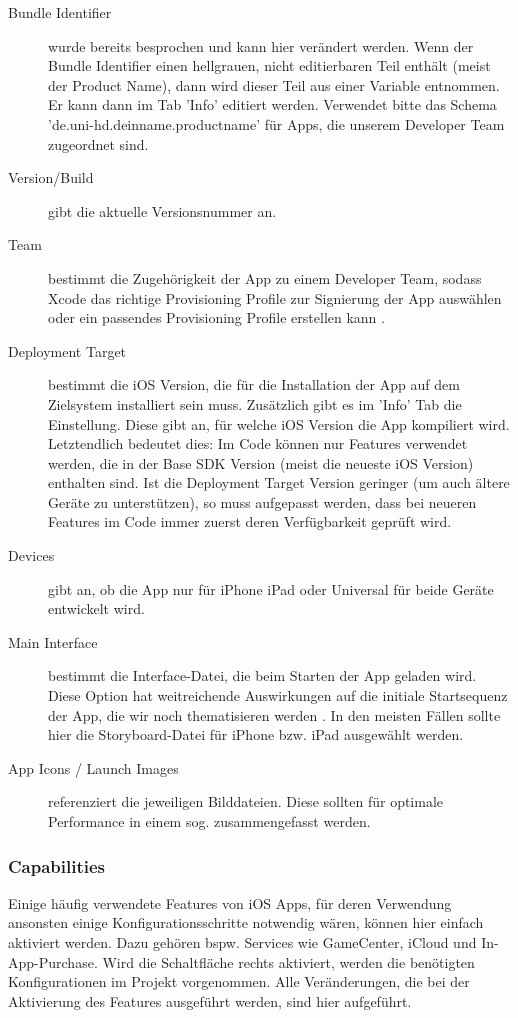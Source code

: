 \documentclass[parskip=half, final]{scrreprt}
\begin{document}
\begin{description}
\item[Bundle Identifier] wurde bereits besprochen und kann hier verändert werden. Wenn der Bundle Identifier einen hellgrauen, nicht editierbaren Teil enthält (meist der Product Name), dann wird dieser Teil aus einer Variable entnommen. Er kann dann im Tab 'Info' editiert werden. Verwendet bitte das Schema 'de.uni-hd.deinname.productname' für Apps, die unserem Developer Team zugeordnet sind.
\item[Version/Build] gibt die aktuelle Versionsnummer an.
\item[Team] bestimmt die Zugehörigkeit der App zu einem Developer Team, sodass Xcode das richtige Provisioning Profile zur Signierung der App auswählen oder ein passendes Provisioning Profile erstellen kann .
\item[Deployment Target] bestimmt die iOS Version, die für die Installation der App auf dem Zielsystem  installiert sein muss. Zusätzlich gibt es im 'Info' Tab die  Einstellung. Diese gibt an, für welche iOS Version die App kompiliert wird. Letztendlich bedeutet dies: Im Code können nur Features verwendet werden, die in der Base SDK Version (meist die neueste iOS Version) enthalten sind. Ist die Deployment Target Version geringer (um auch ältere Geräte zu unterstützen), so muss aufgepasst werden, dass bei neueren Features im Code immer zuerst deren Verfügbarkeit geprüft wird.
\item[Devices] gibt an, ob die App nur für iPhone  iPad oder Universal für beide Geräte entwickelt wird.
\item[Main Interface] bestimmt die Interface-Datei, die beim Starten der App geladen wird. Diese Option hat weitreichende Auswirkungen auf die initiale Startsequenz der App, die wir noch thematisieren werden . In den meisten Fällen sollte hier die Storyboard-Datei für iPhone bzw. iPad ausgewählt werden.
\item[App Icons / Launch Images] referenziert die jeweiligen Bilddateien. Diese sollten für optimale Performance in einem sog.  zusammengefasst werden.
\end{description}

\subsubsection{Capabilities}

Einige häufig verwendete Features von iOS Apps, für deren Verwendung ansonsten einige Konfigurationsschritte notwendig wären, können hier einfach aktiviert werden. Dazu gehören bspw. Services wie GameCenter, iCloud und In-App-Purchase. Wird die Schaltfläche rechts aktiviert, werden die benötigten Konfigurationen im Projekt vorgenommen. Alle Veränderungen, die bei der Aktivierung des Features ausgeführt werden, sind hier aufgeführt.
\end{document}
